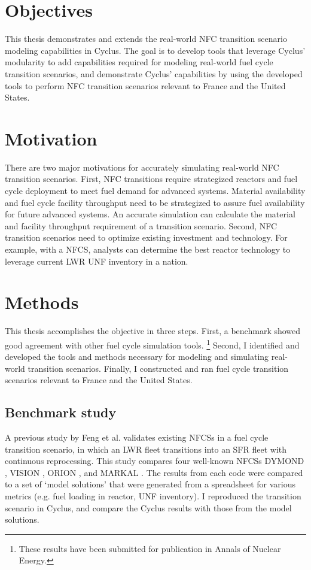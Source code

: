 \section{Objectives}

This thesis demonstrates and extends the real-world \gls{NFC} transition
scenario modeling capabilities in Cyclus. 
The goal is to
develop tools that leverage Cyclus' modularity to
add capabilities required for modeling real-world
fuel cycle transition scenarios, and demonstrate Cyclus'
capabilities by using the developed tools to perform
\gls{NFC} transition scenarios relevant to France and the United
States.

\section{Motivation}

There are two major motivations for accurately simulating
real-world \gls{NFC} transition scenarios.
First, \gls{NFC} transitions require strategized reactors
and fuel cycle deployment to meet fuel demand for advanced systems.
Material availability and fuel cycle facility
throughput need to be strategized 
to assure fuel availability for future advanced systems.
An accurate simulation can calculate the material
and facility throughput requirement of a transition scenario.
Second, \gls{NFC} transition scenarios need to optimize
existing investment and technology. For example, with a \gls{NFCS},
analysts can determine the best reactor technology
to leverage current \gls{LWR} \gls{UNF} inventory in a nation.


\section{Methods}
This thesis accomplishes the objective in three steps. 
First, a benchmark showed good agreement with other
fuel cycle simulation tools. \footnote{These results have been
submitted for publication in Annals of Nuclear Energy.}
Second, I identified and developed the tools and methods necessary
for modeling and simulating real-world transition scenarios.
Finally, I constructed and ran fuel cycle transition scenarios
relevant to France and the United States.

\subsection{Benchmark study}
A previous study by Feng et al. \cite{feng_standardized_2016} validates existing 
\glspl{NFCS} in a fuel cycle transition scenario, in which an \gls{LWR} fleet
transitions into an \gls{SFR} fleet with continuous reprocessing. This 
study compares four well-known \glspl{NFCS}
DYMOND \cite{yacout_modeling_2005},
VISION \cite{jacobson_verifiable_2010},
ORION \cite{gregg_analysis_2012}, and
MARKAL \cite{shay_epa_2006}. The results from each code were
compared to a set of `model solutions' that were generated
from a spreadsheet for various metrics (e.g. fuel loading
in reactor, \gls{UNF} inventory). I reproduced the transition
scenario in Cyclus, and compare the Cyclus results with those
from the model solutions.

